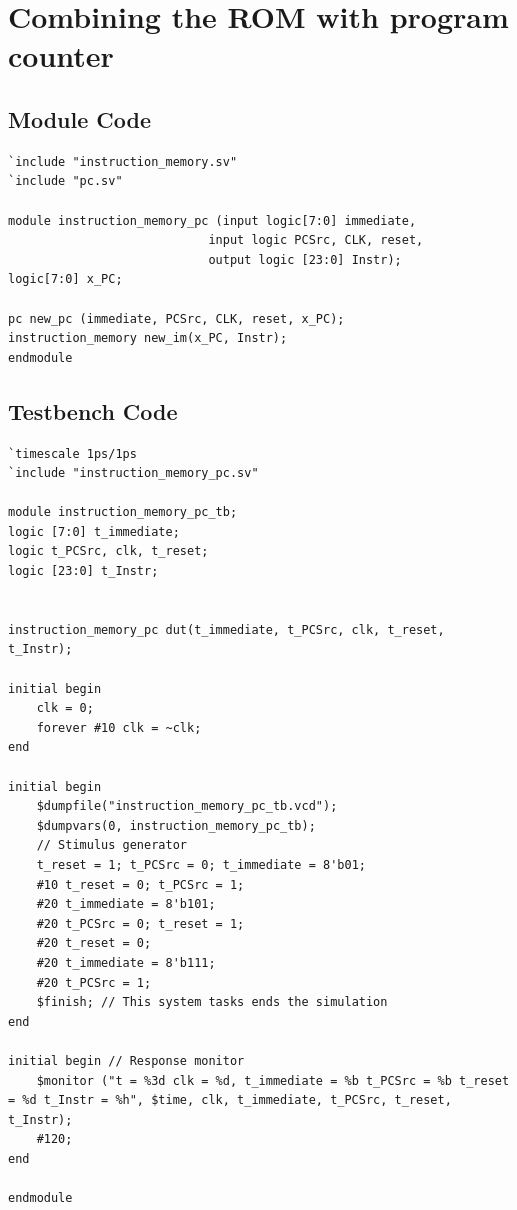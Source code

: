 \documentclass{article}
\begin{document}
\newpage
\section{Combining the ROM with program counter}
\subsection{Module Code}
\begin{lstlisting}
`include "instruction_memory.sv"
`include "pc.sv"

module instruction_memory_pc (input logic[7:0] immediate,
                            input logic PCSrc, CLK, reset,
                            output logic [23:0] Instr);
logic[7:0] x_PC;             

pc new_pc (immediate, PCSrc, CLK, reset, x_PC);
instruction_memory new_im(x_PC, Instr);
endmodule
\end{lstlisting}

\subsection{Testbench Code}
\begin{lstlisting}
`timescale 1ps/1ps
`include "instruction_memory_pc.sv"

module instruction_memory_pc_tb;
logic [7:0] t_immediate;
logic t_PCSrc, clk, t_reset;
logic [23:0] t_Instr;


instruction_memory_pc dut(t_immediate, t_PCSrc, clk, t_reset, t_Instr);

initial begin
    clk = 0;
    forever #10 clk = ~clk;
end

initial begin
    $dumpfile("instruction_memory_pc_tb.vcd"); 
    $dumpvars(0, instruction_memory_pc_tb);
    // Stimulus generator
    t_reset = 1; t_PCSrc = 0; t_immediate = 8'b01;
    #10 t_reset = 0; t_PCSrc = 1;
    #20 t_immediate = 8'b101;
    #20 t_PCSrc = 0; t_reset = 1;
    #20 t_reset = 0;
    #20 t_immediate = 8'b111;
    #20 t_PCSrc = 1;
    $finish; // This system tasks ends the simulation 
end

initial begin // Response monitor
    $monitor ("t = %3d clk = %d, t_immediate = %b t_PCSrc = %b t_reset = %d t_Instr = %h", $time, clk, t_immediate, t_PCSrc, t_reset, t_Instr);
    #120;
end

endmodule
\end{lstlisting}
\end{document}
